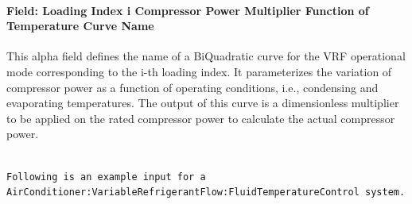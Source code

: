 \paragraph{Field: Loading Index i Compressor Power Multiplier Function of Temperature Curve Name}\label{field-loading-index-i-compressor-power-multiplier-function-of-temperature-curve-name}

This alpha field defines the name of a BiQuadratic curve for the VRF operational mode corresponding to the i-th loading index. It parameterizes the variation of compressor power as a function of operating conditions, i.e., condensing and evaporating temperatures. The output of this curve is a dimensionless multiplier to be applied on the rated compressor power to calculate the actual compressor power.

\begin{lstlisting}

Following is an example input for a AirConditioner:VariableRefrigerantFlow:FluidTemperatureControl system.


\end{lstlisting}
